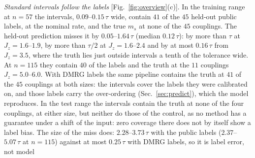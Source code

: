 \documentclass[aps,prx,twocolumn,10pt,superscriptaddress,nofootinbib,longbibliography,floatfix]{revtex4-2}
\theoremstyle{remark}
\newcommand{\Jz}{J_z}
\newcommand{\ms}{m_s}
\begin{document}
\emph{Standard intervals follow the labels} [Fig.~\ref{fig:overview}(c)]. In the training range at $n=57$ the %
intervals, $0.09$--$0.15\,\tau$ wide, contain $41$ of the $45$ held-out public labels, at the nominal rate, and the true %
$\ms$ at none of the $45$ couplings. The held-out prediction misses it by $0.05$--$1.64\,\tau$ (median $0.12\,\tau$): %
by more than $\tau$ at $\Jz=1.6$--$1.9$, by more than $\tau/2$ at $\Jz=1.6$--$2.4$ and by at most $0.16\,\tau$ from $\Jz=3.5$, %
where the truth lies just outside intervals a tenth of the tolerance wide. At $n=115$ they contain $40$ of the labels and the truth at the $11$ couplings $\Jz=5.0$--$6.0$. %
With DMRG labels the same pipeline contains the truth at $41$ of the $45$ couplings at both sizes: the intervals %
cover the labels they were calibrated on, and those labels carry the over-ordering
(Sec.~\ref{sec:predict}), which the model reproduces. In the test range the intervals contain the truth at none of the four couplings, at either size,
but neither do those of the control, as no method has a guarantee under a shift of the input: zero coverage there
does not by itself show a label bias. The size of the miss does: $2.28$--$3.73\,\tau$ with the public labels %
($2.37$--$5.07\,\tau$ at $n=115$) against at most $0.25\,\tau$ with DMRG labels, so it is label error, not model %
\end{document}
